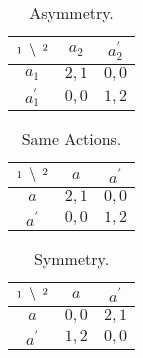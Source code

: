 \begin{minipage}[c]{0.3\textwidth}
	\begin{table}[H]
		\begin{center}
			\begin{tabular}{c | c c}
				\(\uglyfrac{\hspace*{0.1cm} 2}{1 \hspace*{0.1cm}}\) & \(a_2\) & \(a_2^{\prime}\) \\
				\hline
				\(a_1\)                                             & \(2,1\) & \(0,0\)          \\
				\(a_1^{\prime}\)                                    & \(0,0\) & \(1,2\)
			\end{tabular}
		\end{center}
		\caption{Asymmetry.}
		\label{tab:asymmetry}
	\end{table}
\end{minipage}
\begin{minipage}[c]{0.3\textwidth}
	\begin{table}[H]
		\begin{center}
			\begin{tabular}{c | c c}
				\(\uglyfrac{\hspace*{0.1cm} 2}{1 \hspace*{0.1cm}}\) & \(a\)   & \(a^{\prime}\) \\
				\hline
				\(a\)                                               & \(2,1\) & \(0,0\)        \\
				\(a^{\prime}\)                                      & \(0,0\) & \(1,2\)
			\end{tabular}
		\end{center}
		\caption{Same Actions.}
		\label{tab:common}
	\end{table}
\end{minipage}
\begin{minipage}[c]{0.3\textwidth}
	\begin{table}[H]
		\begin{center}
			\begin{tabular}{c | c c}
				\(\uglyfrac{\hspace*{0.1cm} 2}{1 \hspace*{0.1cm}}\) & \(a\)   & \(a^{\prime}\) \\
				\hline
				\(a\)                                               & \(0,0\) & \(2,1\)        \\
				\(a^{\prime}\)                                      & \(1,2\) & \(0,0\)
			\end{tabular}
		\end{center}
		\caption{Symmetry.}
		\label{tab:symmetry}
	\end{table}
\end{minipage}

